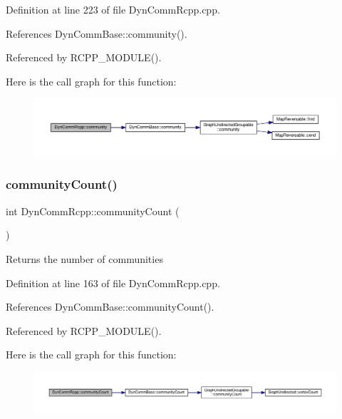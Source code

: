 Definition at line 223 of file Dyn\+Comm\+Rcpp.\+cpp.



References Dyn\+Comm\+Base\+::community().



Referenced by R\+C\+P\+P\+\_\+\+M\+O\+D\+U\+L\+E().

Here is the call graph for this function\+:
\nopagebreak
\begin{figure}[H]
\begin{center}
\leavevmode
\includegraphics[width=350pt]{classDynCommRcpp_ac3c8c1759d2ab106b757557e09834ec5_cgraph}
\end{center}
\end{figure}
\mbox{\label{classDynCommRcpp_a67948d5821c2ccffc4dbf47bac6fba70}} 
\subsubsection{\texorpdfstring{community\+Count()}{communityCount()}}
{\footnotesize\ttfamily int Dyn\+Comm\+Rcpp\+::community\+Count (\begin{DoxyParamCaption}{ }\end{DoxyParamCaption})\hspace{0.3cm}{\ttfamily [inline]}}

\begin{DoxyReturn}{Returns}
the number of communities 
\end{DoxyReturn}


Definition at line 163 of file Dyn\+Comm\+Rcpp.\+cpp.



References Dyn\+Comm\+Base\+::community\+Count().



Referenced by R\+C\+P\+P\+\_\+\+M\+O\+D\+U\+L\+E().

Here is the call graph for this function\+:
\nopagebreak
\begin{figure}[H]
\begin{center}
\leavevmode
\includegraphics[width=350pt]{classDynCommRcpp_a67948d5821c2ccffc4dbf47bac6fba70_cgraph}
\end{center}
\end{figure}
\mbox{\label{classDynCommRcpp_ad74a2abe244e62d9df2b98aeea0d3155}} 
